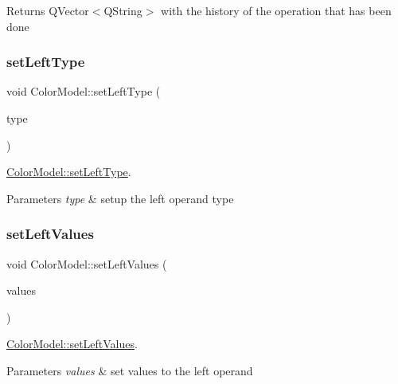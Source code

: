\begin{DoxyReturn}{Returns}
Q\+Vector$<$\+Q\+String$>$ with the history of the operation that has been done 
\end{DoxyReturn}
\mbox{\label{class_color_model_a747a1c9db1fb6f8eecf3a89adf5d5d37}} 
\subsubsection{\texorpdfstring{set\+Left\+Type}{setLeftType}}
{\footnotesize\ttfamily void Color\+Model\+::set\+Left\+Type (\begin{DoxyParamCaption}\item[{Q\+String}]{type }\end{DoxyParamCaption})\hspace{0.3cm}{\ttfamily [slot]}}



\hyperlink{class_color_model_a747a1c9db1fb6f8eecf3a89adf5d5d37}{Color\+Model\+::set\+Left\+Type}. 


\begin{DoxyParams}{Parameters}
{\em type} & setup the left operand type \\
\hline
\end{DoxyParams}
\mbox{\label{class_color_model_a7954f6e500e4a2a7d9aa5813f5e288d5}} 
\subsubsection{\texorpdfstring{set\+Left\+Values}{setLeftValues}}
{\footnotesize\ttfamily void Color\+Model\+::set\+Left\+Values (\begin{DoxyParamCaption}\item[{Q\+Vector$<$ Q\+String $>$}]{values }\end{DoxyParamCaption})\hspace{0.3cm}{\ttfamily [slot]}}



\hyperlink{class_color_model_a7954f6e500e4a2a7d9aa5813f5e288d5}{Color\+Model\+::set\+Left\+Values}. 


\begin{DoxyParams}{Parameters}
{\em values} & set values to the left operand \\
\hline
\end{DoxyParams}
\mbox{\label{class_color_model_ad51072410fbe8572066b3a53ca85a289}} 
